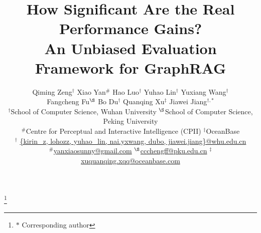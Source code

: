 \documentclass[sigconf,nonacm]{acmart}
\begin{document}
\title [An Unbiased Evaluation Framework for GraphRAG]{How Significant Are the Real Performance Gains? \\ An Unbiased Evaluation Framework for GraphRAG}

\author{
Qiming Zeng$^{\dagger}$ \quad 
Xiao Yan$^{\#}$ \quad 
Hao Luo$^{\dagger}$ \quad 
Yuhao Lin$^{\dagger}$ \quad 
Yuxiang Wang$^{\dagger}$ \\
Fangcheng Fu$^{\S}$ \quad 
Bo Du$^{\dagger}$ \quad 
Quanqing Xu$^{\ddagger}$ \quad 
Jiawei Jiang$^{\dagger,\ast}$  \\
\vspace*{0.3em}
$^{\dagger}$School of Computer Science, Wuhan University \quad 
$^{\S}$School of Computer Science, Peking University \\
$^{\#}$Centre for Perceptual and Interactive Intelligence (CPII) \quad 
$^{\ddagger}$OceanBase \\
\vspace*{0.3em}
$^{\dagger}$ \url{{kirin_z, lohozz, yuhao_lin, nai.yxwang, dubo, jiawei.jiang}@whu.edu.cn} \\
$^{\#}$\url{yanxiaosunny@gmail.com} \quad $^{\S}$\url{ccchengff@pku.edu.cn} \quad $^{\ddagger}$\url{xuquanqing.xqq@oceanbase.com}
}

\thanks{${\ast}$ Corresponding author}

\renewcommand{\shortauthors}{Zeng et al.}
\end{document}
